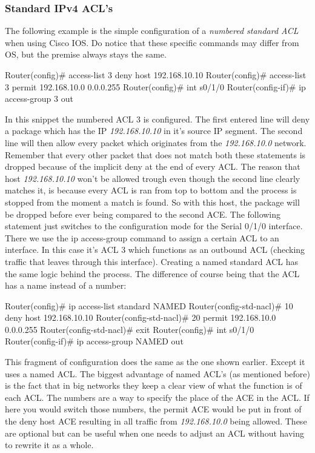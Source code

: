  \subsubsection{Standard IPv4 ACL's}
 The following example is the simple configuration of a \textit{numbered standard ACL} when using Cisco IOS. Do notice that these specific commands may differ from OS, but the premise always stays the same.
\begin{cisco}[title=Numbered standard ACL]
Router(config)#  access-list 3 deny host 192.168.10.10
Router(config)#  access-list 3 permit 192.168.10.0 0.0.0.255
Router(config)#  int s0/1/0
Router(config-if)# ip access-group 3 out
\end{cisco}
In this snippet the numbered ACL 3 is configured. The first entered line will deny a package which has the IP \textit{192.168.10.10} in it's source IP segment. The second line will then allow every packet which originates from the \textit{192.168.10.0} network. Remember that every other packet that does not match both these statements is dropped because of the implicit deny at the end of every ACL. The reason that host \textit{192.168.10.10} won't be allowed trough even though the second line clearly matches it, is because every ACL is ran from top to bottom and the process is stopped from the moment a match is found. So with this host, the package will be dropped before ever being compared to the second ACE.
The following statement just switches to the configuration mode for the Serial 0/1/0 interface. There we use the ip access-group command to assign a certain ACL to an interface. In this case it's ACL 3 which functions as an outbound ACL (checking traffic that leaves through this interface).
Creating a named standard ACL has the same logic behind the process. The difference of course being that the ACL has a name instead of a number:
\begin{cisco}[title=Named standard ACL]
Router(config)#  ip access-list standard NAMED
Router(config-std-nacl)#  10 deny host 192.168.10.10
Router(config-std-nacl)#  20 permit 192.168.10.0 0.0.0.255
Router(config-std-nacl)#  exit
Router(config)#  int s0/1/0
Router(config-if)#  ip access-group NAMED out
\end{cisco}
This fragment of configuration does the same as the one shown earlier. Except it uses a named ACL. The biggest advantage of named ACL's (as mentioned before) is the fact that in big networks they keep a clear view of what the function is of each ACL.
The numbers are a way to specify the place of the ACE in the ACL. If here you would switch those numbers, the permit ACE would be put in front of the deny host ACE resulting in all traffic from \textit{192.168.10.0} being allowed. These are optional but can be useful when one needs to adjust an ACL without having to rewrite it as a whole.
